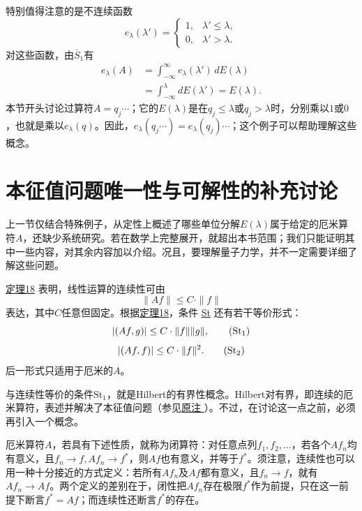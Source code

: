 \documentclass[fontsize=13pt,twoside,openany,headings=normal,parskip=false,bookmarkpackage=false,DIV=calc]{scrbook}
\begin{document}
\hypertarget{origpage-75}{}\label{origpage-75}特别值得注意的是不连续函数
\[
e_\lambda(\lambda')=\begin{cases}1,&\lambda'\leq\lambda,\\0,&\lambda'>\lambda.\end{cases}
\]
对这些函数，由$\hyperref[cond:II.Sbar1]{\overline{S}_1}$有
\begin{align*}
e_\lambda(A)&=\int_{-\infty}^{\infty}e_\lambda(\lambda')\,dE(\lambda)\\
&=\int_{-\infty}^{\lambda}dE(\lambda')=E(\lambda).
\end{align*}
本节开头讨论过算符$A=q_j\cdots$；它的$E(\lambda)$是在$q_j\leq\lambda$或$q_j>\lambda$时，分别乘以$1$或$0$，也就是乘以$e_\lambda(q)$。因此，$e_\lambda(q_j\cdots)=e_\lambda(q_j)\cdots$；这个例子可以帮助理解这些概念。

\section{本征值问题唯一性与可解性的补充讨论}\label{sec:II.9}
上一节仅结合特殊例子，从定性上概述了哪些单位分解$E(\lambda)$属于给定的厄米算符$A$，还缺少系统研究。若在数学上完整展开，就超出本书范围；我们只能证明其中一些内容，对其余内容加以介绍。况且，要理解量子力学，并不一定需要详细了解这些问题。

\hyperref[thm:II.18]{定理18} 表明，线性运算的连续性可由
\begin{equation}
\|Af\|\leq C\cdot\|f\|\tag{St}\label{eq:II.9.St}
\end{equation}
表达，其中$C$任意但固定。根据\CJKglue \hyperref[thm:II.18]{定理18}，条件 \hyperref[eq:II.9.St]{St} 还有若干等价形式：
\begin{equation}
|(Af,g)|\leq C\cdot\|f\|\|g\|,\tag{$\mathrm{St}_1$}\label{eq:II.9.St1}
\end{equation}
\begin{equation}
|(Af,f)|\leq C\cdot\|f\|^2.\tag{$\mathrm{St}_2$}\label{eq:II.9.St2}
\end{equation}
后一形式只适用于厄米的$A$。

与连续性等价的条件$\hyperref[eq:II.9.St1]{\mathrm{St}_1}$，就是Hilbert的有界性概念。Hilbert对有界，即连续的厄米算符，表述并解决了本征值问题（参见\CJKglue \hyperlink{note-70}{原注 }）。不过，在讨论这一点之前，必须再引入一个概念。

厄米算符$A$，若具有下述性质，就称为闭算符：对任意点列$f_1,\allowbreak f_2,\allowbreak \ldots$，若各个$Af_n$均有意义，且$f_n\to f,\allowbreak Af_n\to f^*$，则$Af$也有意义，并等于$f^*$。须注意，连续性也可以用一种十分接近的方式定义：若所有$Af_n$及$Af$都有意义，且$f_n\to f$，就有$Af_n\to Af$。两个定义的差别在于，闭性把$Af_n$存在极限$f^*$作为前提，只在这一前提下断言$f^*=Af$；而连续性还断言$f^*$的存在。
\end{document}
